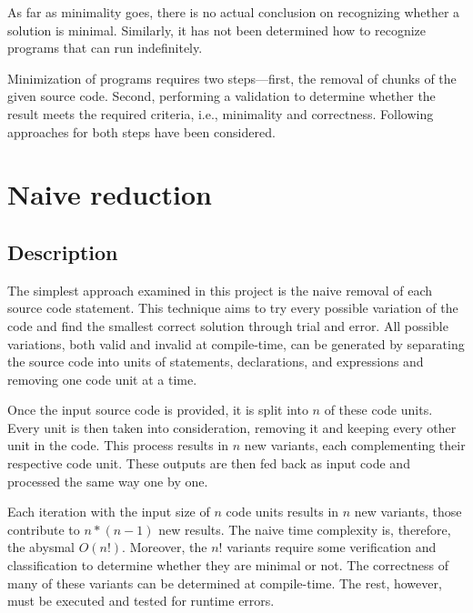 
As far as minimality goes, there is no actual conclusion on recognizing 
whether a solution is minimal.
Similarly, it has not been determined how to recognize programs that can 
run indefinitely.

Minimization of programs requires two steps—first, the removal of chunks 
of the given source code.
Second, performing a validation to determine whether the result meets 
the required criteria, i.e., minimality and correctness.
Following approaches for both steps have been considered.

\section{Naive reduction}

\subsection{Description}

The simplest approach examined in this project is the naive removal of each 
source code statement.
This technique aims to try every possible variation of the code and find 
the smallest correct solution through trial and error.
All possible variations, both valid and invalid at compile-time, can be 
generated by separating the source code into units of statements, 
declarations, and expressions and removing one code unit at a time.

Once the input source code is provided, it is split into $n$ of these 
code units.
Every unit is then taken into consideration, removing it and keeping every 
other unit in the code.
This process results in $n$ new variants, each complementing their 
respective code unit.
These outputs are then fed back as input code and processed the same way 
one by one.



Each iteration with the input size of $n$ code units results in $n$ new 
variants, those contribute to $n * (n - 1) $ new results.
The naive time complexity is, therefore, the abysmal $O(n!)$.
Moreover, the $n!$ variants require some verification and classification 
to determine whether they are minimal or not.
The correctness of many of these variants can be determined at compile-time.
The rest, however, must be executed and tested for runtime errors.

